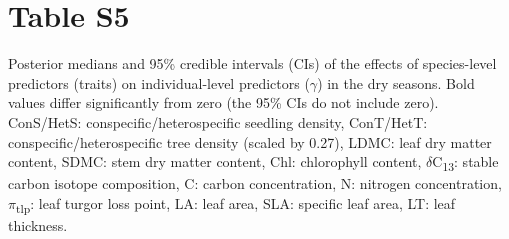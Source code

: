 \documentclass[
  12pt,
  letterpaper,
  DIV=11,
  numbers=noendperiod]{scrartcl}
\begin{document}
\newpage

\hypertarget{table-s5}{%
\section{Table S5}\label{table-s5}}

Posterior medians and 95\% credible intervals (CIs) of the effects of
species-level predictors (traits) on individual-level predictors
(\(\gamma\)) in the dry seasons. Bold values differ significantly from
zero (the 95\% CIs do not include zero). ConS/HetS:
conspecific/heterospecific seedling density, ConT/HetT:
conspecific/heterospecific tree density (scaled by 0.27), LDMC: leaf dry
matter content, SDMC: stem dry matter content, Chl: chlorophyll content,
\(\delta\)C\textsubscript{13}: stable carbon isotope composition, C:
carbon concentration, N: nitrogen concentration,
\(\pi\)\textsubscript{tlp}: leaf turgor loss point, LA: leaf area, SLA:
specific leaf area, LT: leaf thickness.
\end{document}
